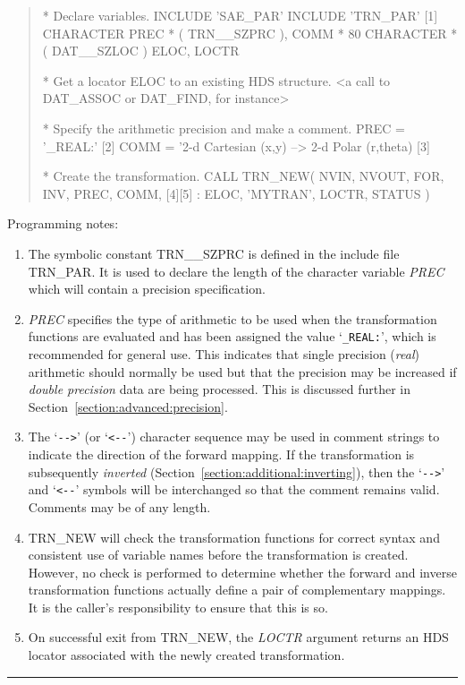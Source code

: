\documentclass[twoside,nolof,11pt]{starlink}
\providecommand{\name}[1]{\small{#1}}
\providecommand{\fortvar}[1]{\emph{#1}}
\providecommand{\exampledone}[0]{\begin{center} \rule{6em}{0.2mm} \end{center}}
\begin{document}
\begin{quote}
\begin{terminalv}
*  Declare variables.
      INCLUDE 'SAE_PAR'
      INCLUDE 'TRN_PAR'                                    [1]
      CHARACTER PREC * ( TRN__SZPRC ), COMM * 80
      CHARACTER * ( DAT__SZLOC ) ELOC, LOCTR

*  Get a locator ELOC to an existing HDS structure.
      <a call to DAT_ASSOC or DAT_FIND, for instance>

*  Specify the arithmetic precision and make a comment.
      PREC = '_REAL:'                                      [2]
      COMM = '2-d Cartesian (x,y) --> 2-d Polar (r,theta)  [3]

*  Create the transformation.
      CALL TRN_NEW( NVIN, NVOUT, FOR, INV, PREC, COMM,     [4][5]
     :              ELOC, 'MYTRAN', LOCTR, STATUS )

\end{terminalv}
\end{quote}

Programming notes:

\begin{enumerate}

\item The symbolic constant \name{TRN\_\_SZPRC} is defined in the include
file \name{TRN\_PAR}.
It is used to declare the length of the character variable \fortvar{PREC}
which will contain a precision specification.

\item \fortvar{PREC} specifies the type of arithmetic to be used when the
transformation functions are evaluated and has been assigned the value
`\verb#_REAL:#', which is recommended for general use.
This indicates that single precision (\emph{real}) arithmetic should normally
be used but that the precision may be increased if \emph{double precision}
data are being processed.
This is discussed further in Section~\ref{section:advanced:precision}.

\item The `\verb#-->#' (or `\verb#<--#') character sequence may be used in
comment strings to indicate the direction of the forward mapping.
If the transformation is subsequently \emph{inverted}
(Section~\ref{section:additional:inverting}), then the `\verb#-->#' and
`\verb#<--#' symbols will be interchanged so that the comment remains valid.
Comments may be of any length.

\item \name{TRN\_NEW} will check the transformation functions for correct
syntax and consistent use of variable names before the transformation is
created.
However, no check is performed to determine whether the forward and inverse
transformation functions actually define a pair of complementary mappings.
It is the caller's responsibility to ensure that this is so.

\item On successful exit from \name{TRN\_NEW}, the \fortvar{LOCTR} argument
returns an \name{HDS} locator associated with the newly created
transformation.

\end{enumerate}
\exampledone
\end{document}
